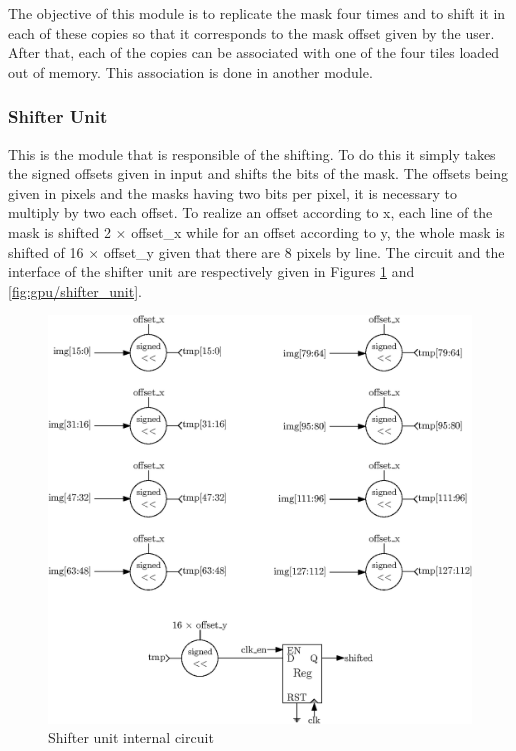 The objective of this module is to replicate the mask four times and to shift it in each of these 
copies so that it corresponds to the mask offset given by the user. After that, each of the copies 
can be associated with one of the four tiles loaded out of memory. This association is done in 
another module.

\subsubsection*{Shifter Unit}

This is the module that is responsible of the shifting. To do this it simply takes the signed 
offsets given in input and shifts the bits of the mask. The offsets being given in pixels and the
masks having two bits per pixel, it is necessary to multiply by two each offset. To realize an 
offset according to x, each line of the mask is shifted 2 $\times$ offset\_x while for an offset 
according to y, the whole mask is shifted of 16 $\times$ offset\_y given that there are 8 pixels 
by line. The circuit and the interface of the shifter unit are respectively given in Figures
\ref{fig:gpu/shifter_unit_in} and \ref{fig:gpu/shifter_unit}.

\begin{figure}[H]
    \centering
    \includegraphics[width=\linewidth]{Chapter4-GPU_CLKU/res/shifter_unit_in}
    \caption{Shifter unit internal circuit}
    \label{fig:gpu/shifter_unit_in}
\end{figure}

